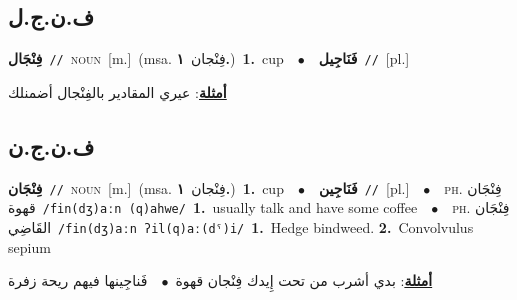 \documentclass[10pt,a4paper,twoside]{article} %
\begin{document}
\begin{multicols}{2}
\vspace{-3mm}
\subsection*{\color{blue}\foreignlanguage{arabic}{ف.ن.ج.ل}\color{blue}{}} 

{\setlength\topsep{0pt}\textbf{\foreignlanguage{arabic}{فِنْجَال}}\ {\color{gray}\texttt{//}\color{black}}\ \textsc{noun}\ [m.]\ \color{gray}(msa. \foreignlanguage{arabic}{فِنْجان}~\foreignlanguage{arabic}{\textbf{١.}})\color{black}\ \textbf{1.}~cup\ \ $\bullet$\ \ \setlength\topsep{0pt}\textbf{\foreignlanguage{arabic}{فَنَاجِيل}}\ {\color{gray}\texttt{//}\color{black}}\ [pl.]\  \begin{flushright}\color{gray}\foreignlanguage{arabic}{\textbf{\underline{\foreignlanguage{arabic}{أمثلة}}}: عيري المقادير بالفِنْجال أضمنلك}\end{flushright}\color{black}} \vspace{2mm}

\vspace{-3mm}
\subsection*{\color{blue}\foreignlanguage{arabic}{ف.ن.ج.ن}\color{blue}{}} 

{\setlength\topsep{0pt}\textbf{\foreignlanguage{arabic}{فِنْجَان}}\ {\color{gray}\texttt{//}\color{black}}\ \textsc{noun}\ [m.]\ \color{gray}(msa. \foreignlanguage{arabic}{فِنْجان}~\foreignlanguage{arabic}{\textbf{١.}})\color{black}\ \textbf{1.}~cup\ \ $\bullet$\ \ \setlength\topsep{0pt}\textbf{\foreignlanguage{arabic}{فَنَاجِين}}\ {\color{gray}\texttt{//}\color{black}}\ [pl.]\ \ $\bullet$\ \ \textsc{ph.} \color{gray} \foreignlanguage{arabic}{فِنْجَان قهوة}\color{black}\ {\color{gray}\texttt{/{\sffamily fin(dʒ)aːn (q)ahwe}/}\color{black}}\ \textbf{1.}~usually talk and have some coffee\ \ $\bullet$\ \ \textsc{ph.} \color{gray} \foreignlanguage{arabic}{فِنْجَان القَاضِي}\color{black}\ {\color{gray}\texttt{/{\sffamily fin(dʒ)aːn ʔil(q)aː(dˤ)i}/}\color{black}}\ \textbf{1.}~Hedge bindweed.  \textbf{2.}~Convolvulus sepium\  \begin{flushright}\color{gray}\foreignlanguage{arabic}{\textbf{\underline{\foreignlanguage{arabic}{أمثلة}}}: بدي أشرب من تحت إِيدك فِنْجان قهوة\ $\bullet$\ \  فَناجِينها فيهم ريحة زفرة}\end{flushright}\color{black}} \vspace{2mm}


\end{multicols}
\end{document}
